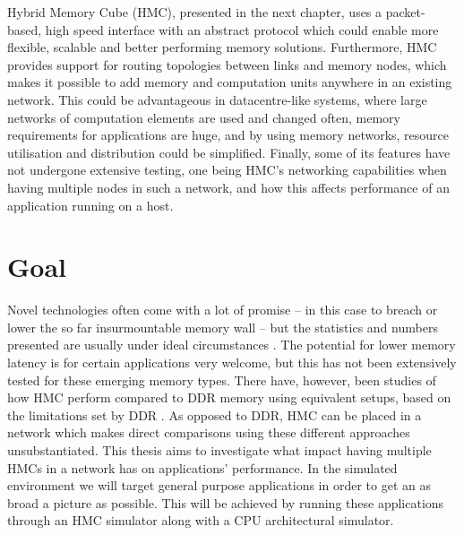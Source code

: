 Hybrid Memory Cube (HMC), presented in the next chapter, uses a packet-based, high speed interface with an abstract protocol which could enable more flexible, scalable and better performing memory solutions. Furthermore, HMC provides support for routing topologies between links and memory nodes, which makes it possible to add memory and computation units anywhere in an existing network. This could be advantageous in datacentre-like systems, where large networks of computation elements are used and changed often, memory requirements for applications are huge, and by using memory networks, resource utilisation and distribution could be simplified. Finally, some of its features have not undergone extensive testing, one being HMC's networking capabilities when having multiple nodes in such a network, and how this affects performance of an application running on a host.

\section{Goal}
Novel technologies often come with a lot of promise -- in this case to breach or lower the so far insurmountable memory wall -- but the statistics and numbers presented are usually under ideal circumstances \cite{Radulovic:2015:TWM:2818950.2818955}. The potential for lower memory latency is for certain applications very welcome, but this has not been extensively tested for these emerging memory types. There have, however, been studies of how HMC perform compared to DDR memory using equivalent setups, based on the limitations set by DDR \cite{santosHMCvsDRAM2017}. As opposed to DDR, HMC can be placed in a network which makes direct comparisons using these different approaches unsubstantiated. This thesis aims to investigate what impact having multiple HMCs in a network has on applications' performance. In the simulated environment we will target general purpose applications in order to get an as broad a picture as possible. This will be achieved by running these applications through an HMC simulator along with a CPU architectural simulator. 

